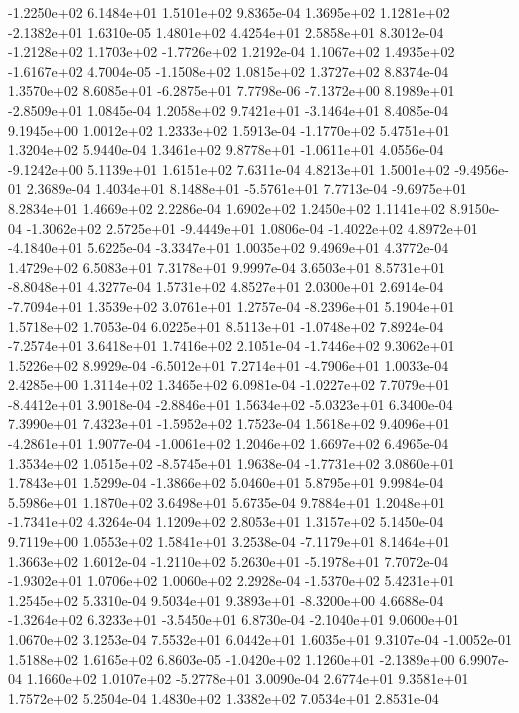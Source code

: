 -1.2250e+02  6.1484e+01  1.5101e+02  9.8365e-04
 1.3695e+02  1.1281e+02 -2.1382e+01  1.6310e-05
1.4801e+02 4.4254e+01 2.5858e+01  8.3012e-04
-1.2128e+02  1.1703e+02 -1.7726e+02  1.2192e-04
 1.1067e+02  1.4935e+02 -1.6167e+02  4.7004e-05
-1.1508e+02  1.0815e+02  1.3727e+02  8.8374e-04
 1.3570e+02  8.6085e+01 -6.2875e+01  7.7798e-06
-7.1372e+00  8.1989e+01 -2.8509e+01  1.0845e-04
 1.2058e+02  9.7421e+01 -3.1464e+01  8.4085e-04
9.1945e+00 1.0012e+02 1.2333e+02  1.5913e-04
-1.1770e+02  5.4751e+01  1.3204e+02  5.9440e-04
 1.3461e+02  9.8778e+01 -1.0611e+01  4.0556e-04
-9.1242e+00  5.1139e+01  1.6151e+02  7.6311e-04
 4.8213e+01  1.5001e+02 -9.4956e-01  2.3689e-04
 1.4034e+01  8.1488e+01 -5.5761e+01  7.7713e-04
-9.6975e+01  8.2834e+01  1.4669e+02  2.2286e-04
1.6902e+02 1.2450e+02 1.1141e+02  8.9150e-04
-1.3062e+02  2.5725e+01 -9.4449e+01  1.0806e-04
-1.4022e+02  4.8972e+01 -4.1840e+01  5.6225e-04
-3.3347e+01  1.0035e+02  9.4969e+01  4.3772e-04
1.4729e+02 6.5083e+01 7.3178e+01  9.9997e-04
 3.6503e+01  8.5731e+01 -8.8048e+01  4.3277e-04
1.5731e+02 4.8527e+01 2.0300e+01  2.6914e-04
-7.7094e+01  1.3539e+02  3.0761e+01  1.2757e-04
-8.2396e+01  5.1904e+01  1.5718e+02  1.7053e-04
 6.0225e+01  8.5113e+01 -1.0748e+02  7.8924e-04
-7.2574e+01  3.6418e+01  1.7416e+02  2.1051e-04
-1.7446e+02  9.3062e+01  1.5226e+02  8.9929e-04
-6.5012e+01  7.2714e+01 -4.7906e+01  1.0033e-04
2.4285e+00 1.3114e+02 1.3465e+02  6.0981e-04
-1.0227e+02  7.7079e+01 -8.4412e+01  3.9018e-04
-2.8846e+01  1.5634e+02 -5.0323e+01  6.3400e-04
 7.3990e+01  7.4323e+01 -1.5952e+02  1.7523e-04
 1.5618e+02  9.4096e+01 -4.2861e+01  1.9077e-04
-1.0061e+02  1.2046e+02  1.6697e+02  6.4965e-04
 1.3534e+02  1.0515e+02 -8.5745e+01  1.9638e-04
-1.7731e+02  3.0860e+01  1.7843e+01  1.5299e-04
-1.3866e+02  5.0460e+01  5.8795e+01  9.9984e-04
5.5986e+01 1.1870e+02 3.6498e+01  5.6735e-04
 9.7884e+01  1.2048e+01 -1.7341e+02  4.3264e-04
1.1209e+02 2.8053e+01 1.3157e+02  5.1450e-04
9.7119e+00 1.0553e+02 1.5841e+01  3.2538e-04
-7.1179e+01  8.1464e+01  1.3663e+02  1.6012e-04
-1.2110e+02  5.2630e+01 -5.1978e+01  7.7072e-04
-1.9302e+01  1.0706e+02  1.0060e+02  2.2928e-04
-1.5370e+02  5.4231e+01  1.2545e+02  5.3310e-04
 9.5034e+01  9.3893e+01 -8.3200e+00  4.6688e-04
-1.3264e+02  6.3233e+01 -3.5450e+01  6.8730e-04
-2.1040e+01  9.0600e+01  1.0670e+02  3.1253e-04
7.5532e+01 6.0442e+01 1.6035e+01  9.3107e-04
-1.0052e-01  1.5188e+02  1.6165e+02  6.8603e-05
-1.0420e+02  1.1260e+01 -2.1389e+00  6.9907e-04
 1.1660e+02  1.0107e+02 -5.2778e+01  3.0090e-04
2.6774e+01 9.3581e+01 1.7572e+02  5.2504e-04
1.4830e+02 1.3382e+02 7.0534e+01  2.8531e-04
